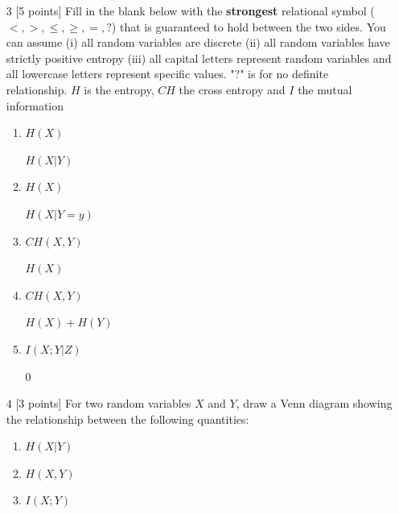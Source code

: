 \documentclass[11pt]{article}
\numberwithin{equation}{section} %
\numberwithin{figure}{section} %
\numberwithin{table}{section} %
\begin{document}
\begin{enumerate}
    \item[3] [5 points] Fill in the blank below with the \textbf{strongest} relational symbol ($<, >, \le, \ge, =, ?$) that is guaranteed to hold between the two sides. You can assume (i) all random variables are discrete (ii) all random variables have strictly positive entropy (iii) all capital letters represent random variables and all lowercase letters represent specific values. "?" is for no definite relationship. $H$ is the entropy, $CH$ the cross entropy and $I$ the mutual information\\
    \begin{enumerate}
        \item $H(X)$  \begin{tcolorbox}[fit,height=0.7cm, width=0.7cm, blank, borderline={1pt}{1pt}, nobeforeafter]
        \end{tcolorbox} $H(X|Y)$
        \item $H(X)$ \begin{tcolorbox}[fit,height=0.7cm, width=0.7cm, blank, borderline={1pt}{1pt}, nobeforeafter]
        \end{tcolorbox} $H(X|Y=y)$
        \item $CH(X, Y)$ \begin{tcolorbox}[fit,height=0.7cm, width=0.7cm, blank, borderline={1pt}{1pt}, nobeforeafter]
        \end{tcolorbox} $H(X)$
        \item $CH(X,Y)$ \begin{tcolorbox}[fit,height=0.7cm, width=0.7cm, blank, borderline={1pt}{1pt}, nobeforeafter]
        \end{tcolorbox} $H(X) + H(Y)$
        \item $I(X;Y|Z)$ \begin{tcolorbox}[fit,height=0.7cm, width=0.7cm, blank, borderline={1pt}{1pt}, nobeforeafter]
        \end{tcolorbox} $0$
    \end{enumerate}
    
    \item[4] [3 points] For two random variables $X$ and $Y$, draw a Venn diagram showing the relationship between the following quantities:
    \begin{enumerate}
        \item $H(X|Y)$
        \item $H(X, Y)$ 
        \item $I(X;Y)$ 
    \end{enumerate}
    \begin{tcolorbox}[fit,height=5cm, width=\linewidth, blank, borderline={1pt}{1pt}]
    \end{tcolorbox}
    

\end{enumerate}
\end{document}
